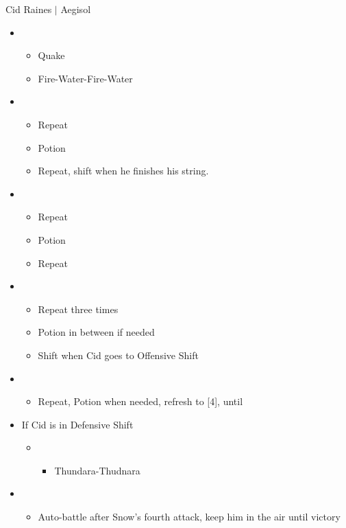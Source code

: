 \begin{battle}{Cid Raines $|$ Aegisol}
\begin{multicols}{2}
\begin{itemize}
    \item \first
    \begin{itemize}
        \item Quake
        \item Fire-Water-Fire-Water
    \end{itemize}
    \item \third
    \begin{itemize}
        \item Repeat
        \item Potion
        \item Repeat, shift when he finishes his string.
    \end{itemize}
    \item \fifth
    \begin{itemize}
        \item Repeat
        \item Potion
        \item Repeat
    \end{itemize}
    \item \second
    \begin{itemize}
        \item Repeat three times
        \item Potion in between if needed
        \item Shift when Cid goes to Offensive Shift
    \end{itemize}
    \item \third
    \begin{itemize}
        \item Repeat, Potion when needed, refresh to [4], until \stagger
    \end{itemize}
    \item If Cid is in Defensive Shift
    \begin{itemize}
        \item \second
        \begin{itemize}
            \item Thundara-Thudnara
        \end{itemize}
    \end{itemize}
    \item \sixth
    \begin{itemize}
        \item Auto-battle after Snow's fourth attack, keep him in the air until victory

\end{itemize}
\end{itemize}
\end{multicols}
\end{battle}
